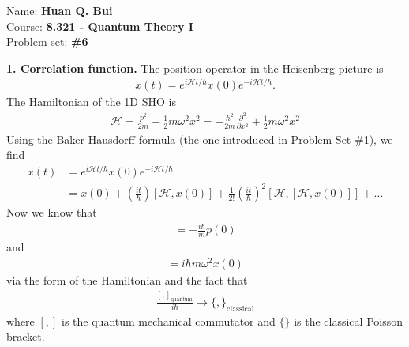 \documentclass{article}
\theoremstyle{definition}
\newcommand{\p}{\partial}
\newcommand{\ham}{\mathcal{H}}
\newcommand{\f}[2]{\frac{#1}{#2}}
\newcommand{\lp}{\left(}
\newcommand{\rp}{\right)}
\begin{document}
\begin{framed}
\noindent Name: \textbf{Huan Q. Bui}\\
Course: \textbf{8.321 - Quantum Theory I}\\
Problem set: \textbf{\#6}
\end{framed}
	



\noindent \textbf{1. Correlation function.} The position operator in the Heisenberg picture is 
\begin{align*}
x(t) = e^{i\ham t/\hbar} x(0) e^{-i\ham t/\hbar}.
\end{align*}
The Hamiltonian of the 1D SHO is 
\begin{align*}
\ham = \f{p^2}{2m} + \f{1}{2}m\omega^2 x^2 = -\f{\hbar^2}{2m}\f{\p^2}{\p x^2} + \f{1}{2}m\omega^2 x^2
\end{align*}
Using the Baker-Hausdorff formula (the one introduced in Problem Set \#1), we find 
\begin{align*}
x(t) &=  e^{i\ham t/\hbar} x(0) e^{-i\ham t/\hbar}\\
&= x(0) + \lp \f{it}{\hbar} \rp[\ham, x(0)] + \f{1}{2!}\lp \f{it}{\hbar} \rp^2 [\ham,[\ham,x(0)]] + \dots
\end{align*} 
Now we know that 
\begin{align*}
[\ham,x(0)] = -\f{i\hbar}{m} p(0)
\end{align*}
and 
\begin{align*}
[\ham, p(0)]= i\hbar m\omega^2 x(0)
\end{align*}
via the form of the Hamiltonian and the fact that
\begin{align*}
\f{[,]_\text{quantum}}{i\hbar} \to \{,\}_\text{classical}
\end{align*}
where $[,]$ is the quantum mechanical commutator and $\{\}$ is the classical Poisson bracket. \\
\end{document}
